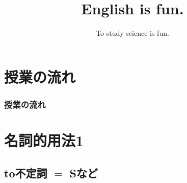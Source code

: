 \documentclass[aspectratio=169,xcolor={dvipsnames,table}]{beamer}
\title{English is fun.}
\subtitle{To study science is fun.}
\author{}
\institute[]{}
\date[]
\begin{document}
\begin{frame}[plain]
  \titlepage
\end{frame}

\section*{授業の流れ}
\begin{frame}[plain]
  \frametitle{授業の流れ}
  \tableofcontents
\end{frame}

\section{名詞的用法1}
\subsection{to不定詞 $=$ Sなど}
\end{document}
